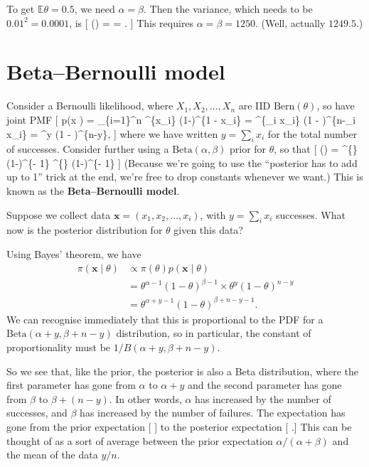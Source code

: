 \documentclass[
  letterpaper,
  DIV=11,
  numbers=noendperiod]{scrreprt}
\theoremstyle{remark}
\begin{document}
To get \(\mathbb E\theta = 0.5\), we need \(\alpha = \beta\). Then the
variance, which needs to be \(0.01^2 = 0.0001\), is {[} \Var(\theta) =
 =  .
{]} This requires \(\alpha = \beta = 1250\). (Well, actually
\(1249.5\).)

\hypertarget{beta-bern}{%
\section{Beta--Bernoulli model}\label{beta-bern}}

Consider a Bernoulli likelihood, where \(X_1, X_2, \dots, X_n\) are IID
\(\text{Bern}(\theta)\), so have joint PMF {[} p(\mathbf x \mid \theta)
= \prod\_\{i=1\}\^{}n \theta\^{}\{x\_i\} (1-\theta)\^{}\{1 - x\_i\} =
\theta\^{}\{\sum\_i x\_i\} (1 - \theta)\^{}\{n-\sum\_i x\_i\} =
\theta\^{}y (1 - \theta)\^{}\{n-y\}, {]} where we have written
\(y = \sum_i x_i\) for the total number of successes. Consider further
using a \(\text{Beta}(\alpha, \beta)\) prior for \(\theta\), so that {[}
\pi(\theta) =  \theta\^{}\{\}
(1-\theta)\^{}\{\beta - 1\} \propto \theta\^{}\{\}
(1-\theta)\^{}\{\beta - 1\} {]} (Because we're going to use the
``posterior has to add up to 1'' trick at the end, we're free to drop
constants whenever we want.) This is known as the
\textbf{Beta--Bernoulli model}.

Suppose we collect data \(\mathbf x = (x_1, x_2, \dots, x_i)\), with
\(y = \sum_i x_i\) successes. What now is the posterior distribution for
\(\theta\) given this data?

Using Bayes' theorem, we have \begin{align*}
\pi(\mathbf x \mid \theta)
  &\propto \pi(\theta) p(\mathbf x \mid \theta) \\
  &= \theta^{\alpha-1} (1-\theta)^{\beta - 1} \times \theta^y (1 - \theta)^{n-y} \\
  &= \theta^{\alpha + y - 1} (1 - \theta)^{\beta + n - y - 1} .
\end{align*} We can recognise immediately that this is proportional to
the PDF for a \(\text{Beta}(\alpha + y, \beta + n - y)\) distribution,
so in particular, the constant of proportionality must be
\(1/B(\alpha + y, \beta + n - y)\).

So we see that, like the prior, the posterior is also a Beta
distribution, where the first parameter has gone from \(\alpha\) to
\(\alpha + y\) and the second parameter has gone from \(\beta\) to
\(\beta + (n-y)\). In other words, \(\alpha\) has increased by the
number of successes, and \(\beta\) has increased by the number of
failures. The expectation has gone from the prior expectation {[}
\frac{\alpha}{\alpha + \beta} {]} to the posterior expectation {[}
 .{]} This can be thought of as a
sort of average between the prior expectation
\(\alpha/(\alpha + \beta)\) and the mean of the data \(y/n\).
\end{document}
